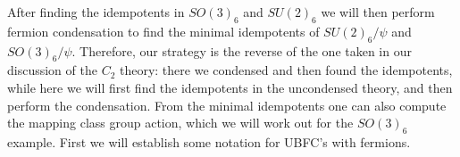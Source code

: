 \documentclass[12pt,a4paper]{article}
\begin{document}
After finding the idempotents in $SO(3)_6$ and $SU(2)_6$ we will then perform fermion condensation to find the minimal idempotents of $SU(2)_6/\psi$ and $SO(3)_6/\psi$. 
Therefore, our strategy is the reverse of the one taken in our discussion of the $C_2$ theory: there we condensed and then found the idempotents, while here we will first find the idempotents in the uncondensed theory, 
and then perform the condensation.
From the minimal idempotents one can also compute the mapping class group action, which we will work out for the $SO(3)_6$ example.
First we will establish some notation for UBFC's with fermions.
\end{document}
